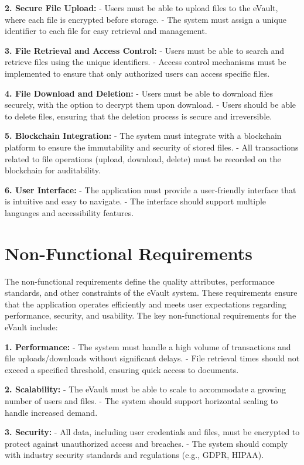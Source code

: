 \documentclass[12pt,a4paper]{report}
\begin{document}
\textbf{2. Secure File Upload:}
   - Users must be able to upload files to the eVault, where each file is encrypted before storage.
   - The system must assign a unique identifier to each file for easy retrieval and management.

\textbf{3. File Retrieval and Access Control:}
   - Users must be able to search and retrieve files using the unique identifiers.
   - Access control mechanisms must be implemented to ensure that only authorized users can access specific files.

\textbf{4. File Download and Deletion:}
   - Users must be able to download files securely, with the option to decrypt them upon download.
   - Users should be able to delete files, ensuring that the deletion process is secure and irreversible.

\textbf{5. Blockchain Integration:}
   - The system must integrate with a blockchain platform to ensure the immutability and security of stored files.
   - All transactions related to file operations (upload, download, delete) must be recorded on the blockchain for auditability.

\textbf{6. User Interface:}
   - The application must provide a user-friendly interface that is intuitive and easy to navigate.
   - The interface should support multiple languages and accessibility features.

\section{Non-Functional Requirements}

The non-functional requirements define the quality attributes, performance standards, and other constraints of the eVault system. These requirements ensure that the application operates efficiently and meets user expectations regarding performance, security, and usability. The key non-functional requirements for the eVault include:

\textbf{1. Performance:}
   - The system must handle a high volume of transactions and file uploads/downloads without significant delays.
   - File retrieval times should not exceed a specified threshold, ensuring quick access to documents.

\textbf{2. Scalability:}
   - The eVault must be able to scale to accommodate a growing number of users and files.
   - The system should support horizontal scaling to handle increased demand.

\textbf{3. Security:}
   - All data, including user credentials and files, must be encrypted to protect against unauthorized access and breaches.
   - The system should comply with industry security standards and regulations (e.g., GDPR, HIPAA).
\end{document}
